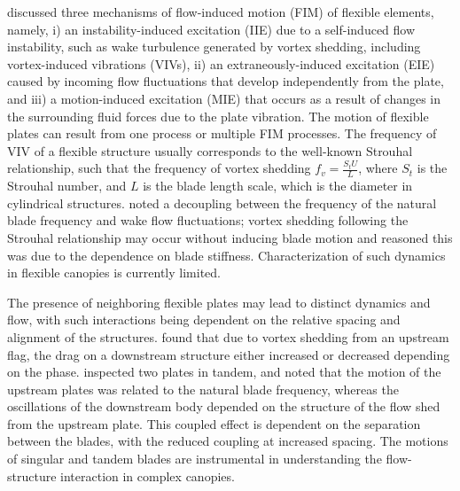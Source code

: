 \documentclass[lineno,authoryear]{FLO_v1}%
\theoremstyle{definition}
\begin{document}
\citet{naudascher2017flow} discussed three mechanisms 
of flow-induced motion (FIM) of flexible elements, namely, i) 
an instability-induced excitation (IIE) due to a self-induced 
flow instability, such as wake turbulence generated by vortex 
shedding, including vortex-induced vibrations (VIVs), ii) an 
extraneously-induced excitation (EIE) caused by incoming flow 
fluctuations that develop independently from the plate, and iii) a 
motion-induced excitation (MIE) that occurs as a result of changes 
in the surrounding fluid forces due to the plate vibration. The motion 
of flexible plates can result from one process or multiple FIM processes. 
The frequency of VIV of a flexible structure usually corresponds to the 
well-known Strouhal relationship, such that the frequency of vortex 
shedding  $f_v= \frac{S_tU}{L}$, where  $S_t$  is the Strouhal number, 
and $L$ is the blade length scale, which is the diameter in cylindrical structures.
 \citet{jin2018instability} noted a decoupling between the frequency of the natural 
 blade frequency and wake flow fluctuations; vortex shedding following the Strouhal 
 relationship may occur without inducing blade motion and reasoned this was due to the 
 dependence on blade stiffness. Characterization of such dynamics in flexible canopies 
 is currently limited.

The presence of neighboring flexible plates may lead to distinct dynamics and flow, with 
such interactions being dependent on the relative spacing and alignment of the structures.
 \citet{kim2010constructive} found that due to vortex shedding from an upstream flag, the 
 drag on a downstream structure either increased or decreased depending on the phase. 
 \citet{jin2018couple} inspected two plates in tandem, and noted that the motion of the 
 upstream plates was related to the natural blade frequency, whereas the oscillations of 
 the downstream body depended on the structure of the flow shed from the upstream plate. This 
 coupled effect is dependent on the separation between the blades, with the reduced coupling at 
 increased spacing. The motions of singular and tandem blades are instrumental in understanding 
 the flow-structure interaction in complex canopies.
\end{document}
